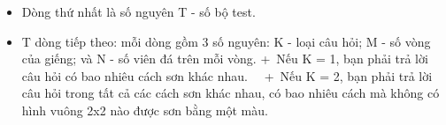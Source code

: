 \begin{itemize}
	\item Dòng thứ nhất là số nguyên T - số bộ test.
	\item T dòng tiếp theo: mỗi dòng gồm 3 số nguyên: K - loại câu hỏi; M - số vòng của giếng; và N - số viên đá trên mỗi vòng.   
+ Nếu K = 1, bạn phải trả lời câu hỏi có bao nhiêu cách sơn khác nhau.  
 + Nếu K = 2, bạn phải trả lời câu hỏi trong tất cả các cách sơn khác nhau, có bao nhiêu cách mà không có hình vuông 2x2 nào được sơn bằng một màu.  
\end{itemize}